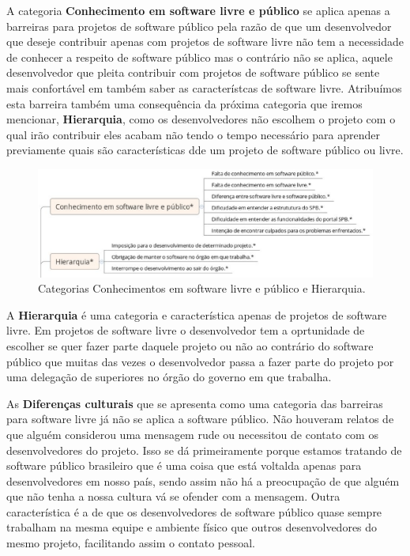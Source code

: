A categoria \textbf{Conhecimento em software livre e público} se aplica apenas a
barreiras para projetos de software público pela razão de que um desenvolvedor 
que deseje contribuir apenas com projetos de software livre não tem a necessidade 
de conhecer a respeito de software público mas o contrário não se aplica, aquele 
desenvolvedor que pleita contribuir com projetos de software público se sente
mais confortável em também saber as característcas de software livre. Atribuímos
esta barreira também uma consequência da próxima categoria que iremos mencionar, 
\textbf{Hierarquia}, como os desenvolvedores não escolhem o projeto com o qual irão
contribuir eles acabam não tendo o tempo necessário para aprender previamente quais
são características dde um projeto de software público ou livre.

\begin{figure}[h]
	\centering
	\label{fig:conhecimentos}
		\includegraphics[keepaspectratio=true,scale=0.5]{figuras/conhecimentos.eps}
	\caption{Categorias Conhecimentos em software livre e público e Hierarquia.}
\end{figure}

A \textbf{Hierarquia} é uma categoria e característica apenas de projetos de
software livre. Em projetos de software livre o desenvolvedor tem a oprtunidade
de escolher se quer fazer parte daquele projeto ou não ao contrário do software
público que muitas das vezes o desenvolvedor passa a fazer parte do projeto por
uma delegação de superiores no órgão do governo em que trabalha.

As \textbf{Diferenças culturais} que se apresenta como uma categoria das barreiras
para software livre já não se aplica a software público. Não houveram relatos de que alguém 
considerou uma mensagem rude ou necessitou de contato com os desenvolvedores do projeto.
Isso se dá primeiramente porque estamos tratando de software público brasileiro que 
é uma coisa que está voltalda apenas para desenvolvedores em nosso país, sendo assim
não há a preocupação de que alguém que não tenha a nossa cultura vá se ofender com a 
mensagem. Outra característica é a de que os desenvolvedores de software público quase
sempre trabalham na mesma equipe e ambiente físico que outros desenvolvedores do mesmo 
projeto, facilitando assim o contato pessoal.

